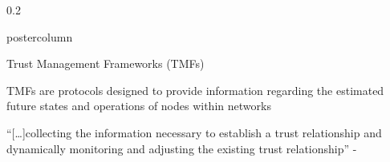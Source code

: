 \documentclass[final,hyperref={pdfpagelabels=false}]{beamer}
\def\colwidth{0.2\linewidth}
\begin{document}
\begin{frame}[fragile]
\begin{columns}[T]
		\begin{column}{\colwidth}
			\begin{beamercolorbox}[center,wd=\textwidth]{postercolumn}
				\begin{minipage}[T]{.98\textwidth} %
					\parbox[t]{\textwidth}{ %
						\begin{block}{Trust Management Frameworks (TMFs)}
							
							TMFs are protocols designed to provide information regarding the estimated future states and operations of nodes within networks
							\vspace{0.3\baselineskip}
							
							``[\ldots]collecting the information necessary to establish a trust relationship and dynamically monitoring and adjusting the existing trust relationship'' - \cite{Li2007}
							\vspace{0.3\baselineskip}
							

\end{block}}
\end{minipage}
\end{beamercolorbox}
\end{column}
\end{columns}
\end{frame}
\end{document}
